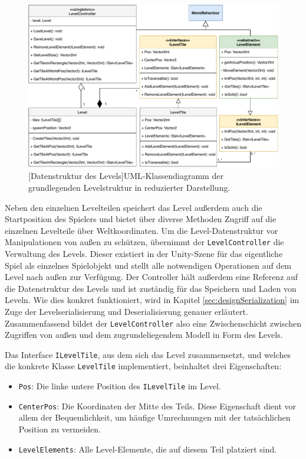 \begin{figure}[h]
 \centering
 \includegraphics[width=1.0\linewidth]{diagrams/Level_Data_Structure.pdf}
 [Datenstruktur des Levels]{UML-Klassendiagramm der grundlegenden Levelstruktur in reduzierter Darstellung.}
	\label{fig:level_structure}
\end{figure}

Neben den einzelnen Levelteilen speichert das Level außerdem auch die Startposition des Spielers und bietet über diverse Methoden Zugriff auf die einzelnen Levelteile über Weltkoordinaten. Um die Level-Datenstruktur vor Manipulationen von außen zu schützen, übernimmt der \texttt{LevelController} die Verwaltung des Levels. Dieser existiert in der Unity-Szene für das eigentliche Spiel als einzelnes Spielobjekt und stellt alle notwendigen Operationen auf dem Level nach außen zur Verfügung. Der Controller hält außerdem eine Referenz auf die Datenstruktur des Levels und ist zuständig für das Speichern und Laden von Leveln. Wie dies konkret funktioniert, wird in Kapitel \ref{sec:designSerialization} im Zuge der Levelserialisierung und Deserialisierung genauer erläutert. Zusammenfassend bildet der \texttt{LevelController} also eine Zwischenschicht zwischen Zugriffen von außen und dem zugrundeliegendem Modell in Form des Levels.

Das Interface \texttt{ILevelTile}, aus dem sich das Level zusammensetzt, und welches die konkrete Klasse \texttt{LevelTile} implementiert, beinhaltet drei Eigenschaften:
\begin{itemize}
	\item \texttt{Pos}: Die linke untere Position des \texttt{ILevelTile} im Level.
	\item \texttt{CenterPos}: Die Koordinaten der Mitte des Teils. Diese Eigenschaft dient vor allem der Bequemlichkeit, um häufige Umrechnungen mit der tatsächlichen Position zu vermeiden.
	\item \texttt{LevelElements}: Alle Level-Elemente, die auf diesem Teil platziert sind.
\end{itemize}


